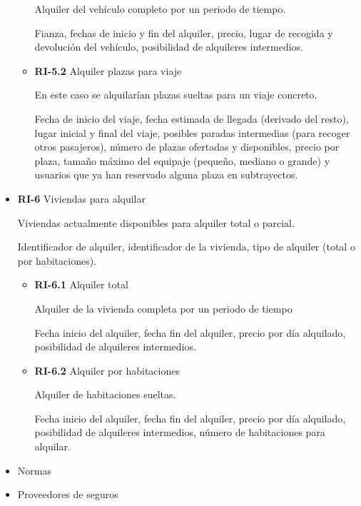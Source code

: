 \documentclass[11pt,spanish]{article} %
\begin{document}
\begin{itemize}
\begin{itemize}
		Alquiler del vehículo completo por un periodo de tiempo.
		
		Fianza, fechas de inicio y fin del alquiler, precio, lugar de recogida y devolución del vehículo, posibilidad de alquileres intermedios.
		
		\item \textbf{RI-5.2} Alquiler plazas para viaje
		
		En este caso se alquilarían plazas sueltas para un viaje concreto.
		
		Fecha de inicio del viaje, fecha estimada de llegada (derivado del resto), lugar inicial y final del viaje, posibles paradas intermedias (para recoger otros pasajeros), número de plazas ofertadas y disponibles, precio por plaza, tamaño máximo del equipaje (pequeño, mediano o grande) y usuarios que ya han reservado alguna plaza en subtrayectos.
	\end{itemize}

	\item \textbf{RI-6} Viviendas para alquilar
	
	Viviendas actualmente disponibles para alquiler total o parcial.
	
	Identificador de alquiler, identificador de la vivienda, tipo de alquiler (total o por habitaciones). 
		
	\begin{itemize}
		\item \textbf{RI-6.1} Alquiler total
		
		Alquiler de la vivienda completa por un periodo de tiempo
		
		Fecha inicio del alquiler, fecha fin del alquiler, precio por día alquilado, posibilidad de alquileres intermedios.
		
		\item \textbf{RI-6.2} Alquiler por habitaciones
		
		Alquiler de habitaciones sueltas.
		
		Fecha inicio del alquiler, fecha fin del alquiler, precio por día alquilado, posibilidad de alquileres intermedios, número de habitaciones para alquilar.
	\end{itemize}

	\item Normas
	\item Proveedores de seguros	
\end{itemize}
\end{document}
